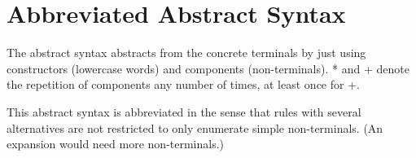 \documentclass{article}
\begin{document}
\section{Abbreviated Abstract Syntax}

The abstract syntax abstracts from the concrete terminals by just using
constructors (lowercase words) and components (non-terminals). * and + denote
the repetition of components any number of times, at least once for +.

This abstract syntax is abbreviated in the sense that rules with several
alternatives are not restricted to only enumerate simple non-terminals.
(An expansion would need more non-terminals.)


\end{document}
